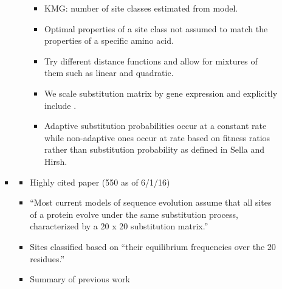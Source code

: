 \begin{itemize}
\begin{itemize}
\begin{itemize}
\begin{itemize}
  \begin{itemize}
  \item KMG: number of site classes estimated from model.
  \item Optimal properties of a site class not assumed to match the  properties of a specific amino acid.
  \item Try different distance functions and allow for mixtures of them such as linear and quadratic.
  \item We scale substitution matrix by gene expression and explicitly include \Ne.
  \item Adaptive substitution probabilities occur at a constant rate while non-adaptive ones occur at rate based on fitness ratios rather than substitution probability as defined in Sella and Hirsh.
  \end{itemize}
\end{itemize}
\item \citet{LartillotAndPhilippe04} 
  \begin{itemize}
  \item Highly cited paper (550 as of 6/1/16)
  \item ``Most current models of sequence evolution assume that all sites of a protein evolve under the same substitution process, characterized by a 20 x 20 substitution matrix.''
  \item Sites classified based on ``their equilibrium frequencies over the 20 residues.''
  \item Summary of previous work
    \begin{quote}

\end{quote}
\end{itemize}
\end{itemize}
\end{itemize}
\end{itemize}
